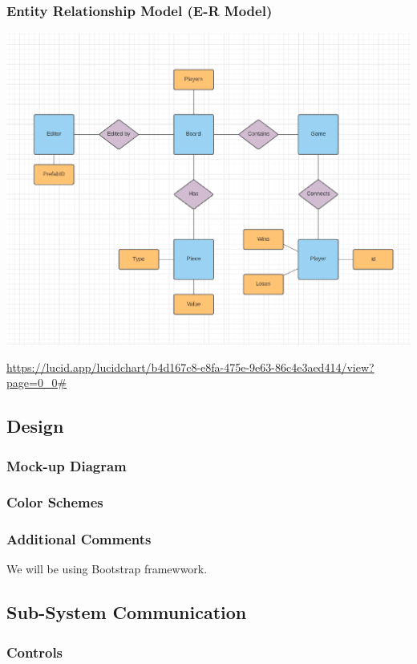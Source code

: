 \documentclass[11pt]{article}
\begin{document}
\subsubsection{Entity Relationship Model (E-R Model)}
\label{sec:orgd5d27e2}
\begin{center}
\includegraphics[width=.9\linewidth]{diagrams/out/ERDiagram.png}
\end{center}
\url{https://lucid.app/lucidchart/b4d167c8-e8fa-475e-9e63-86c4e3aed414/view?page=0\_0\#}
\subsection{Design}
\label{sec:org4d28cd9}
\subsubsection{Mock-up Diagram}
\label{sec:org6d82168}
\subsubsection{Color Schemes}
\label{sec:orgfef44a7}
\subsubsection{Additional Comments}
\label{sec:org680132a}
We will be using Bootstrap framewwork.
\subsection{Sub-System Communication}
\label{sec:org6525c74}
\subsubsection{Controls}
\label{sec:orgf411ffd}
\end{document}
